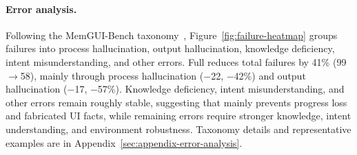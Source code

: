 \paragraph{Error analysis.}
Following the MemGUI-Bench taxonomy~\cite{liu2026memgui}, Figure~\ref{fig:failure-heatmap} groups failures into process hallucination, output hallucination, knowledge deficiency, intent misunderstanding, and other errors. Full \conact reduces total failures by 41\% (99$\to$58), mainly through process hallucination ($-$22, $-$42\%) and output hallucination ($-$17, $-$57\%). Knowledge deficiency, intent misunderstanding, and other errors remain roughly stable, suggesting that \conact mainly prevents progress loss and fabricated UI facts, while remaining errors require stronger knowledge, intent understanding, and environment robustness. Taxonomy details and representative examples are in Appendix~\ref{sec:appendix-error-analysis}.



